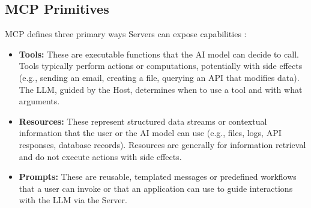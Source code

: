 \subsection*{MCP Primitives}
MCP defines three primary ways Servers can expose capabilities :

\begin{itemize}
    \item \textbf{Tools:} These are executable functions that the AI model can decide to call. Tools typically perform actions or computations, 
    potentially with side effects (e.g., sending an email, creating a file, querying an API that modifies data). The LLM, guided by the Host, 
    determines when to use a tool and with what arguments.
    \item \textbf{Resources:} These represent structured data streams or contextual information that the user or the AI model can use
     (e.g., files, logs, API responses, database records). Resources are generally for information retrieval and do not execute actions with side effects.
    \item \textbf{Prompts:} These are reusable, templated messages or predefined workflows that a user can invoke or that an application
     can use to guide interactions with the LLM via the Server.
\end{itemize}

